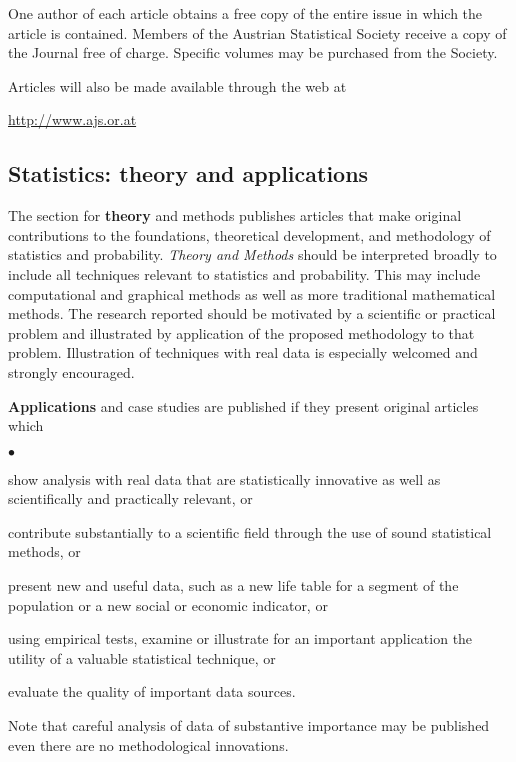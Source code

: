 \documentclass[article]{ajs}
\begin{document}
One author of each article obtains a free copy of the entire issue
in which the article is contained. Members of the Austrian
Statistical Society receive a copy of the Journal free of charge.
Specific volumes may be purchased from the Society.

Articles will also be made available through the web at 
\begin{center}
\href{http://www.ajs.or.at}{http://www.ajs.or.at}
\end{center}


\subsection{Statistics: theory and applications}

The section for {\bf theory} and methods publishes articles that
make original contributions to the foundations, theoretical
development, and methodology of statistics and probability. {\em
Theory and Methods\/} should be interpreted broadly to include all
techniques relevant to statistics and probability. This may
include computational and graphical methods as well as more
traditional mathematical methods. The research reported should be
motivated by a scientific or practical problem and illustrated by
application of the proposed methodology to that problem.
Illustration of techniques with real data is especially welcomed
and strongly encouraged.
\medskip

{\bf Applications} and case studies are published if they present
original articles which
\begin{list}{$\bullet$}{\setlength{\topsep}{0mm}\setlength{\itemsep}{-1mm}}
 \item show analysis with real data that are statistically
       innovative as well as scientifically and practically relevant, or
 \item contribute substantially to a scientific field through the
       use of sound statistical methods, or
 \item present new and useful data, such as a new life table for
       a segment of the population or a new social or economic
       indicator, or
 \item using empirical tests, examine or illustrate for an important
       application the utility of a valuable statistical technique, or
 \item evaluate the quality of important data sources.
\end{list}
Note that careful analysis of data of substantive importance may be
published even there are no methodological innovations.
\end{document}
